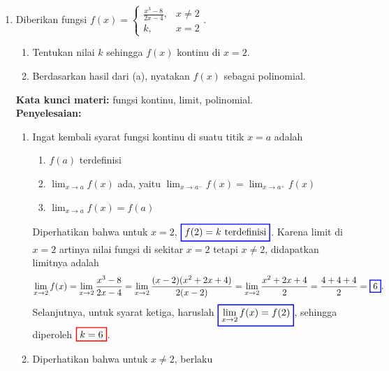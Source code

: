 \documentclass[10pt,openany,a4paper]{article}
\theoremstyle{definition}
\theoremstyle{definition}
\theoremstyle{plain}
\newenvironment{jawab}[2][tes]{%
\par\noindent\textbf{Kata kunci materi:} #1.\\
\textbf{Penyelesaian:} #2%
}{}
\begin{document}
\begin{enumerate}
    \item Diberikan fungsi \(f(x) = \begin{cases} \frac{x^3-8}{2x-4}, & x \neq 2 \\ k, & x=2 \end{cases}\).
    \begin{enumerate}
        \item Tentukan nilai \(k\) sehingga \(f(x)\) kontinu di \(x = 2\).
        \item Berdasarkan hasil dari (a), nyatakan \(f(x)\) sebagai polinomial.
    \end{enumerate}
    \begin{jawab}[fungsi kontinu, limit, polinomial]{
        \begin{enumerate}
            \item Ingat kembali syarat fungsi kontinu di suatu titik \(x = a\) adalah
            \begin{enumerate}
                \item \(f(a)\) terdefinisi
                \item \(\displaystyle \lim_{x \to a} f(x)\) ada, yaitu $\displaystyle \lim_{x \to a^-} f(x) = \lim_{x \to a^+} f(x)$
                \item \(\displaystyle\lim_{x \to a} f(x) = f(a)\)
            \end{enumerate}
            Diperhatikan bahwa untuk \(x = 2\), \(\colorlet{oldcolor}{.}
        \color{blue}
        \setlength{\fboxrule}{1pt} \boxed{\color{oldcolor}f(2) = k~\text{terdefinisi}}\color{oldcolor}\). Karena limit di $x=2$ artinya nilai fungsi di sekitar $x=2$ tetapi $x\neq 2$, didapatkan limitnya adalah
            \begin{align*}
            \lim_{x \to 2} f(x) = \lim_{x \to 2} \frac{x^3 - 8}{2x - 4} = \lim_{x \to 2} \frac{(x-2)(x^2 + 2x + 4)}{2(x-2)} = \lim_{x \to 2} \frac{x^2 + 2x + 4}{2} = \frac{4 + 4 + 4}{2} = \colorlet{oldcolor}{.}
        \color{blue}
        \setlength{\fboxrule}{1pt} \boxed{\color{oldcolor}6}\color{oldcolor}.
            \end{align*}
            Selanjutnya, untuk syarat ketiga, haruslah $\displaystyle \colorlet{oldcolor}{.}
        \color{blue}
        \setlength{\fboxrule}{1pt} \boxed{\color{oldcolor}\lim_{x \to 2} f(x) = f(2)}\color{oldcolor}$, sehingga diperoleh $\colorlet{oldcolor}{.}
        \color{red}
        \setlength{\fboxrule}{1pt} \boxed{\color{oldcolor}k=6}\color{oldcolor}$.
        \item Diperhatikan bahwa untuk $x\neq 2$, berlaku

\end{enumerate}}
\end{jawab}
\end{enumerate}
\end{document}
